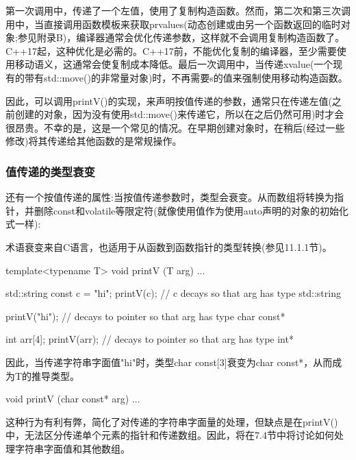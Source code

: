 第一次调用中，传递了一个左值，使用了复制构造函数。然而，第二次和第三次调用中，当直接调用函数模板来获取prvalues(动态创建或由另一个函数返回的临时对象;参见附录B)，编译器通常会优化传递参数，这样就不会调用复制构造函数了。C++17起，这种优化是必需的。C++17前，不能优化复制的编译器，至少需要使用移动语义，这通常会使复制成本降低。最后一次调用中，当传递xvalue(一个现有的带有std::move()的非常量对象)时，不再需要s的值来强制使用移动构造函数。

因此，可以调用printV()的实现，来声明按值传递的参数，通常只在传递左值(之前创建的对象，因为没有使用std::move()来传递它，所以在之后仍然可用)时才会很昂贵。不幸的是，这是一个常见的情况。在早期创建对象时，在稍后(经过一些修改)将其传递给其他函数的是常规操作。

\subsubsection{值传递的类型衰变}

还有一个按值传递的属性:当按值传递参数时，类型会衰变。从而数组将转换为指针，并删除const和volatile等限定符(就像使用值作为使用auto声明的对象的初始化式一样):

\begin{notice}术语衰变来自C语言，也适用于从函数到函数指针的类型转换(参见11.1.1节)。
\end{notice}

\begin{cpp}
template<typename T>
void printV (T arg) {
	...
}

std::string const c = "hi";
printV(c); // c decays so that arg has type std::string

printV("hi"); // decays to pointer so that arg has type char const*

int arr[4];
printV(arr); // decays to pointer so that arg has type int*
\end{cpp}

因此，当传递字符串字面值"hi"时，类型char const[3]衰变为char const*，从而成为T的推导类型。

\begin{cpp}
void printV (char const* arg)
{
	...
}
\end{cpp}

这种行为有利有弊，简化了对传递的字符串字面量的处理，但缺点是在printV()中，无法区分传递单个元素的指针和传递数组。因此，将在7.4节中将讨论如何处理字符串字面值和其他数组。




